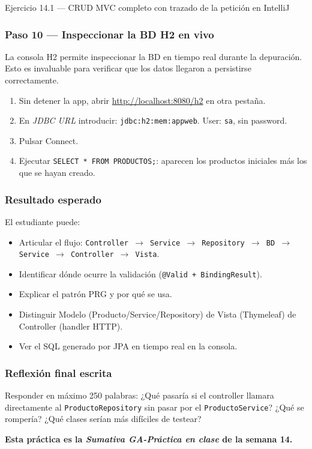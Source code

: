 \begin{cajaejercicio}{Ejercicio 14.1 --- CRUD MVC completo con trazado de la petición en IntelliJ}
\subsubsection*{Paso 10 --- Inspeccionar la BD H2 en vivo}

La consola H2 permite inspeccionar la BD en tiempo real
durante la depuración. Esto es invaluable para verificar que los
datos llegaron a persistirse correctamente.


\begin{enumerate}
\item Sin detener la app, abrir \url{http://localhost:8080/h2} en otra
pestaña.
\item En \emph{JDBC URL} introducir: \texttt{jdbc:h2:mem:appweb}.
User: \texttt{sa}, sin password.
\item Pulsar Connect.
\item Ejecutar \texttt{SELECT * FROM PRODUCTOS;}: aparecen los
productos iniciales más los que se hayan creado.
\end{enumerate}

\subsubsection*{Resultado esperado}

El estudiante puede:
\begin{itemize}
\item Articular el flujo: \texttt{Controller $\to$ Service $\to$
Repository $\to$ BD $\to$ Service $\to$ Controller $\to$ Vista}.
\item Identificar dónde ocurre la validación
(\texttt{@Valid + BindingResult}).
\item Explicar el patrón PRG y por qué se usa.
\item Distinguir Modelo (Producto/Service/Repository) de Vista
(Thymeleaf) de Controller (handler HTTP).
\item Ver el SQL generado por JPA en tiempo real en la consola.
\end{itemize}

\subsubsection*{Reflexión final escrita}

Responder en máximo 250 palabras: ¿Qué pasaría si el controller
llamara directamente al \texttt{ProductoRepository} sin pasar por el
\texttt{ProductoService}? ¿Qué se rompería? ¿Qué clases serían más
difíciles de testear?

\textbf{Esta práctica es la \emph{Sumativa GA-Práctica en clase} de
la semana 14.}
\end{cajaejercicio}

